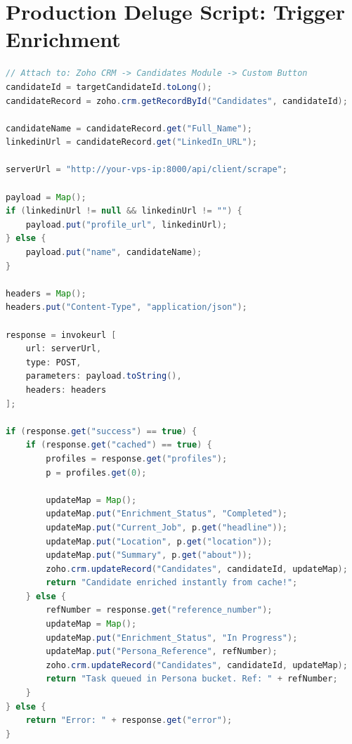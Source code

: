 \documentclass[11pt,a4paper]{report}
\begin{document}
\section{Production Deluge Script: Trigger Enrichment}
\begin{lstlisting}[language=Java,caption=Zoho Deluge Candidate Trigger Script]
// Attach to: Zoho CRM -> Candidates Module -> Custom Button
candidateId = targetCandidateId.toLong();
candidateRecord = zoho.crm.getRecordById("Candidates", candidateId);

candidateName = candidateRecord.get("Full_Name");
linkedinUrl = candidateRecord.get("LinkedIn_URL");

serverUrl = "http://your-vps-ip:8000/api/client/scrape";

payload = Map();
if (linkedinUrl != null && linkedinUrl != "") {
    payload.put("profile_url", linkedinUrl);
} else {
    payload.put("name", candidateName);
}

headers = Map();
headers.put("Content-Type", "application/json");

response = invokeurl [
    url: serverUrl,
    type: POST,
    parameters: payload.toString(),
    headers: headers
];

if (response.get("success") == true) {
    if (response.get("cached") == true) {
        profiles = response.get("profiles");
        p = profiles.get(0);
        
        updateMap = Map();
        updateMap.put("Enrichment_Status", "Completed");
        updateMap.put("Current_Job", p.get("headline"));
        updateMap.put("Location", p.get("location"));
        updateMap.put("Summary", p.get("about"));
        zoho.crm.updateRecord("Candidates", candidateId, updateMap);
        return "Candidate enriched instantly from cache!";
    } else {
        refNumber = response.get("reference_number");
        updateMap = Map();
        updateMap.put("Enrichment_Status", "In Progress");
        updateMap.put("Persona_Reference", refNumber);
        zoho.crm.updateRecord("Candidates", candidateId, updateMap);
        return "Task queued in Persona bucket. Ref: " + refNumber;
    }
} else {
    return "Error: " + response.get("error");
}
\end{lstlisting}
\end{document}

